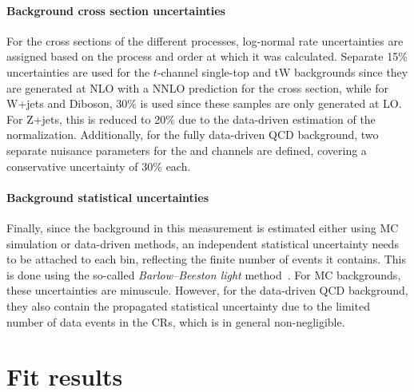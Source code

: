 \paragraph{Background cross section uncertainties}

For the cross sections of the different processes, log-normal rate uncertainties are assigned based on the process and order at which it was calculated. Separate 15\% uncertainties are used for the $t$-channel single-top and tW backgrounds since they are generated at NLO with a NNLO prediction for the cross section, while
for W+jets and Diboson, 30\% is used since these samples are only generated at LO. For Z+jets, this is reduced to 20\% due to the data-driven estimation of the normalization.
Additionally, for the fully data-driven QCD background, two separate nuisance parameters for the \ejets and \mujets channels are defined, covering a conservative uncertainty of 30\% each.

\paragraph{Background statistical uncertainties}

Finally, since the background in this measurement is estimated either using MC simulation or data-driven methods, an independent statistical uncertainty needs to be attached to each bin, reflecting the finite number of events it contains. This is done using the so-called \textit{Barlow--Beeston light} method~\cite{Barlow:1993dm}. For MC backgrounds, these uncertainties are minuscule. However, for the data-driven QCD background, they also contain the propagated statistical uncertainty due to the limited number of data events in the CRs, which is in general non-negligible.


\section{Fit results}
\label{sec:ttxs:fitresults}

